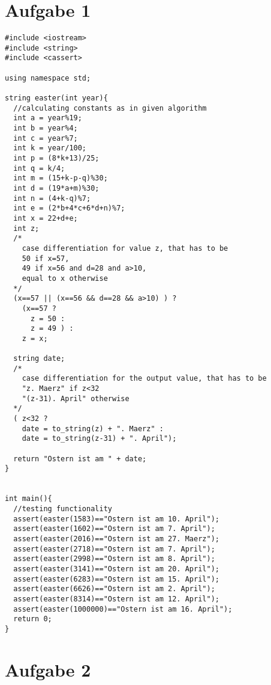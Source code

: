 \section*{Aufgabe 1}

\begin{lstlisting}
#include <iostream>
#include <string>
#include <cassert>

using namespace std;

string easter(int year){
  //calculating constants as in given algorithm
  int a = year%19;
  int b = year%4;
  int c = year%7;
  int k = year/100;
  int p = (8*k+13)/25;
  int q = k/4;
  int m = (15+k-p-q)%30;
  int d = (19*a+m)%30;
  int n = (4+k-q)%7;
  int e = (2*b+4*c+6*d+n)%7;
  int x = 22+d+e;
  int z;
  /*
    case differentiation for value z, that has to be 
    50 if x=57, 
    49 if x=56 and d=28 and a>10, 
    equal to x otherwise
  */
  (x==57 || (x==56 && d==28 && a>10) ) ? 
    (x==57 ? 
      z = 50 : 
      z = 49 ) : 
    z = x;
  
  string date;
  /*
    case differentiation for the output value, that has to be
    "z. Maerz" if z<32
    "(z-31). April" otherwise
  */
  ( z<32 ?
    date = to_string(z) + ". Maerz" : 
    date = to_string(z-31) + ". April");
  
  return "Ostern ist am " + date;
}


int main(){
  //testing functionality
  assert(easter(1583)=="Ostern ist am 10. April");
  assert(easter(1602)=="Ostern ist am 7. April");
  assert(easter(2016)=="Ostern ist am 27. Maerz");
  assert(easter(2718)=="Ostern ist am 7. April");
  assert(easter(2998)=="Ostern ist am 8. April");
  assert(easter(3141)=="Ostern ist am 20. April");
  assert(easter(6283)=="Ostern ist am 15. April");
  assert(easter(6626)=="Ostern ist am 2. April");
  assert(easter(8314)=="Ostern ist am 12. April");
  assert(easter(1000000)=="Ostern ist am 16. April");
  return 0;
}
\end{lstlisting}

\section*{Aufgabe 2}


